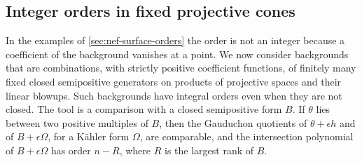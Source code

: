 \subsection{Integer orders in fixed projective cones}
\label{sec:nef-projective-integer-cones}

In the examples of \cref{sec:nef-surface-orders} the order is not an integer because a coefficient of the background vanishes at a point. We now consider backgrounds that are combinations, with strictly positive coefficient functions, of finitely many fixed closed semipositive generators on products of projective spaces and their linear blowups. Such backgrounds have integral orders even when they are not closed. The tool is a comparison with a closed semipositive form $B$. If $\theta$ lies between two positive multiples of $B$, then the Gauduchon quotients of $\theta+\epsilon h$ and of $B+\epsilon\Omega$, for a K\"ahler form $\Omega$, are comparable, and the intersection polynomial of $B+\epsilon\Omega$ has order $n-R$, where $R$ is the largest rank of $B$.

